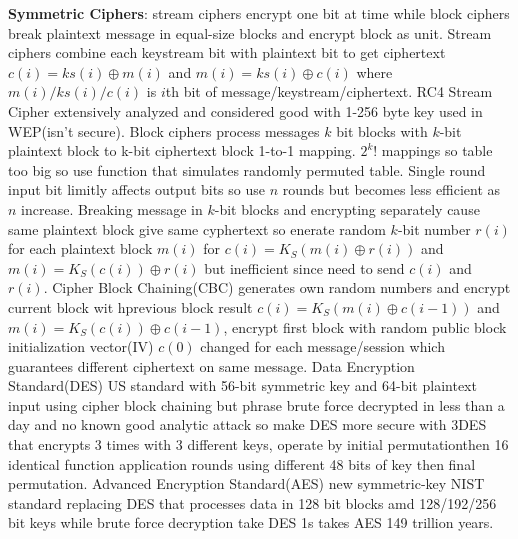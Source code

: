 \documentclass[9pt]{extarticle}
\begin{document}
\begin{multicols}{2}
\textbf{Symmetric Ciphers}: stream ciphers encrypt one bit at time while block ciphers break plaintext message in equal-size blocks and encrypt block as unit. Stream ciphers combine each keystream bit with plaintext bit to get ciphertext $c(i)=ks(i)\oplus{m(i)}$ and $m(i)=ks(i)\oplus{c(i)}$ where $m(i)/ks(i)/c(i)$ is $i$th bit of message/keystream/ciphertext. RC4 Stream Cipher extensively analyzed and considered good with 1-256 byte key used in WEP(isn't secure). Block ciphers process messages $k$ bit blocks with $k$-bit plaintext block to k-bit ciphertext block 1-to-1 mapping.  $2^k!$ mappings so table too big so use function that simulates randomly permuted table. Single round input bit limitly affects output bits so use $n$ rounds but becomes less efficient as $n$ increase. Breaking message in $k$-bit blocks and encrypting separately cause same plaintext block give same cyphertext so enerate random $k$-bit number $r(i)$ for each plaintext block $m(i)$ for $c(i)=K_S(m(i)\oplus{r(i)})$ and $m(i)=K_S(c(i))\oplus{r(i)}$ but inefficient since need to send $c(i)$ and $r(i)$. Cipher Block Chaining(CBC) generates own random numbers and encrypt current block wit hprevious block result $c(i)=K_S(m(i)\oplus{c(i-1)})$ and $m(i)=K_S(c(i))\oplus{c(i-1)}$, encrypt first block with random public block initialization vector(IV) $c(0)$ changed for each message/session which guarantees different ciphertext on same message. Data Encryption Standard(DES) US standard with 56-bit symmetric key and 64-bit plaintext input using cipher block chaining but phrase brute force decrypted in less than a day and no known good analytic attack so make DES more secure with 3DES that encrypts 3 times with 3 different keys, operate by initial permutationthen 16 identical function application rounds using different 48 bits of key then final permutation. Advanced Encryption Standard(AES) new symmetric-key NIST standard replacing DES that processes data in 128 bit blocks amd 128/192/256 bit keys while brute force decryption take DES 1s takes AES 149 trillion years.


\end{multicols}
\end{document}
